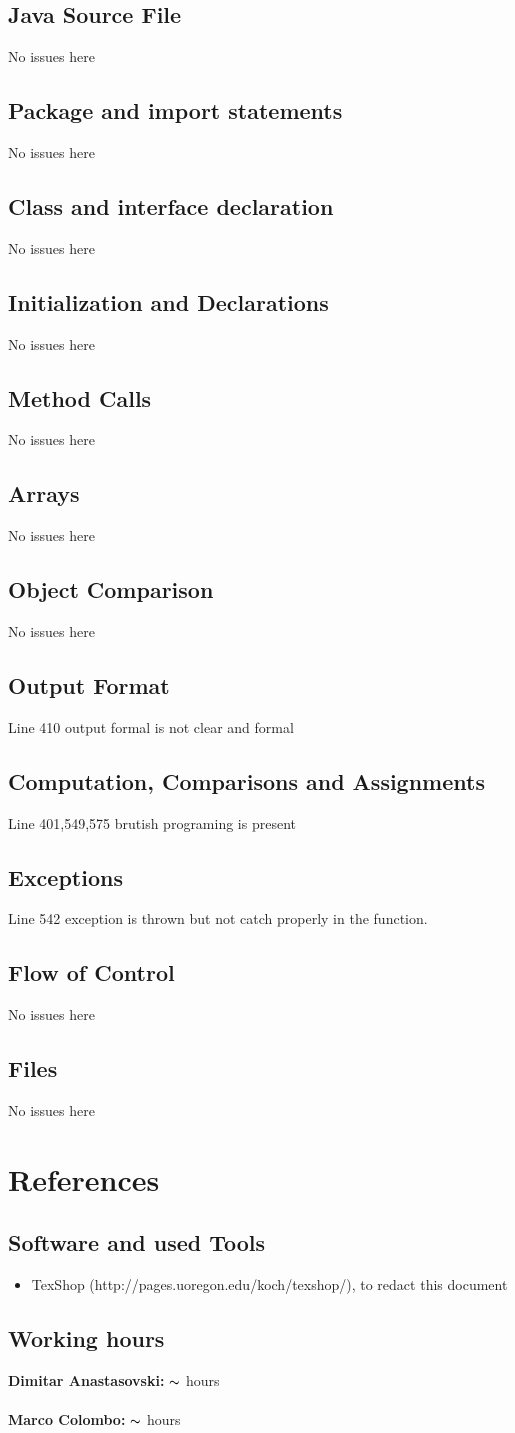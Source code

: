 \documentclass[12pt, oneside]{book}   	%
\begin{document}
\section{Java Source File}
No issues here
\section{Package and import statements}
No issues here
\section{Class and interface declaration}
No issues here
\section{Initialization and Declarations}
No issues here
\section{Method Calls}
No issues here
\section{Arrays}
No issues here
\section{Object Comparison}
No issues here
\section{Output Format}
Line 410 output formal is not clear and formal
\section{Computation, Comparisons and Assignments}
Line 401,549,575 brutish programing is present
\section{Exceptions}
Line 542 exception is thrown but not catch properly in the function. 
\section{Flow of Control}
No issues here
\section{Files}
No issues here
\chapter{References}
\section{Software and used Tools}
\begin{itemize}
\item TexShop (http://pages.uoregon.edu/koch/texshop/), to redact this document
\end{itemize}
\section{Working hours}
\textbf{Dimitar Anastasovski:} $\thicksim$ hours
\\
\\
\textbf{Marco Colombo:} $\thicksim$ hours
\end{document}
